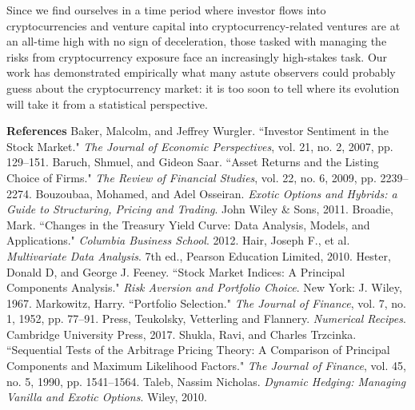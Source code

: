 \documentclass[12pt,twoside]{article}
\begin{document}
\bigbreak
Since we find ourselves in a time period where investor flows into cryptocurrencies and venture capital into cryptocurrency-related ventures are at an all-time high with no sign of deceleration, those tasked with managing the risks from cryptocurrency exposure face an increasingly high-stakes task. Our work has demonstrated empirically what many astute observers could probably guess about the cryptocurrency market: it is too soon to tell where its evolution will take it from a statistical perspective.

\newpage

{\large \textbf{References}}
\bigbreak
Baker, Malcolm, and Jeffrey Wurgler. ``Investor Sentiment in the Stock Market." \textit{The Journal of Economic Perspectives}, vol. 21, no. 2, 2007, pp. 129–151.
\bigbreak
Baruch, Shmuel, and Gideon Saar. ``Asset Returns and the Listing Choice of Firms." \textit{The Review of Financial Studies}, vol. 22, no. 6, 2009, pp. 2239–2274.
\bigbreak
Bouzoubaa, Mohamed, and Adel Osseiran. \textit{Exotic Options and Hybrids: a Guide to Structuring, Pricing and Trading}. John Wiley \& Sons, 2011.
\bigbreak
Broadie, Mark. ``Changes in the Treasury Yield Curve: Data Analysis, Models, and Applications." \textit{Columbia Business School}. 2012.
\bigbreak
Hair, Joseph F., et al. \textit{Multivariate Data Analysis}. 7th ed., Pearson Education Limited, 2010. 
\bigbreak
Hester, Donald D, and George J. Feeney. ``Stock Market Indices: A Principal Components Analysis." \textit{Risk Aversion and Portfolio Choice}. New York: J. Wiley, 1967.
\bigbreak
Markowitz, Harry. ``Portfolio Selection." \textit{The Journal of Finance}, vol. 7, no. 1, 1952, pp. 77–91.
\bigbreak
Press, Teukolsky, Vetterling and Flannery. \textit{Numerical Recipes}. Cambridge University Press, 2017.
\bigbreak
Shukla, Ravi, and Charles Trzcinka. ``Sequential Tests of the Arbitrage Pricing Theory: A Comparison of Principal Components and Maximum Likelihood Factors." \textit{The Journal of Finance}, vol. 45, no. 5, 1990, pp. 1541–1564.
\bigbreak
Taleb, Nassim Nicholas. \textit{Dynamic Hedging: Managing Vanilla and Exotic Options}. Wiley, 2010.
\end{document}
